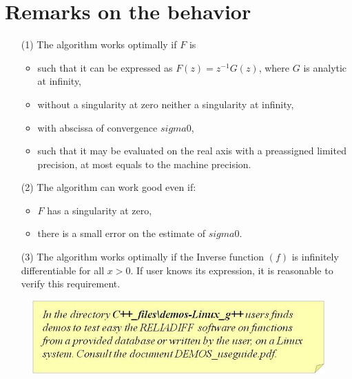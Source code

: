 \documentclass[10pt]{article}
\begin{document}
\begin{description}
\begin{itemize}
\begin{itemize}
\begin{itemize}
\end{itemize}

\end{itemize}

\end{itemize}

\end{description}


\section{Remarks on the behavior}
\begin{itemize}
\item[(1)] The algorithm works optimally if $F$  is
\begin{itemize}
\item such that it can be expressed as $F(z) =z^{-1} G(z)$, where $G$ is analytic at infinity,
\item without a singularity at zero neither a singularity at infinity,
\item with abscissa of convergence $sigma0$,
\item such that it may be evaluated on the real axis with a preassigned limited precision, at most equals
 to the machine precision.
\end{itemize}

\item[(2)] The algorithm can work good even if:
\begin{itemize}
\item $F$  has a singularity at zero,
\item there is a small error on the estimate of $sigma0$.
\end{itemize}

\item[(3)] The algorithm works optimally if the Inverse  function $(f)$ is  infinitely differentiable  for all $x>0$. If user knows its expression, it is reasonable to verify this requirement.
\end{itemize}

\begin{figure}[!h]
\begin{flushright}
\includegraphics[scale=0.8]{rel10}
\end{flushright}
\end{figure}
\end{document}
